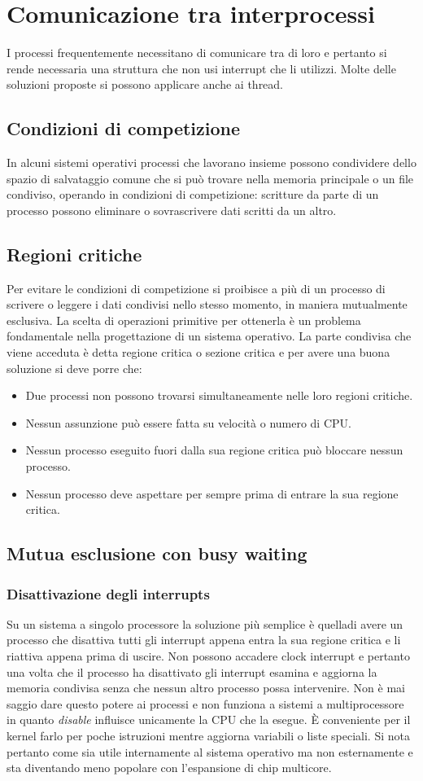 \section{Comunicazione tra interprocessi}
I processi frequentemente necessitano di comunicare tra di loro e pertanto si rende necessaria una struttura che non usi interrupt che li utilizzi. Molte delle soluzioni proposte si 
possono applicare anche ai thread.
\subsection{Condizioni di competizione}
In alcuni sistemi operativi processi che lavorano insieme possono condividere dello spazio di salvataggio comune che si pu\`o trovare nella memoria principale o un file condiviso, 
operando in condizioni di competizione: scritture da parte di un processo possono eliminare o sovrascrivere dati scritti da un altro.
\subsection{Regioni critiche}
Per evitare le condizioni di competizione si proibisce a pi\`u di un processo di scrivere o leggere i dati condivisi nello stesso momento, in maniera mutualmente esclusiva. La scelta di 
operazioni primitive per ottenerla \`e un problema fondamentale nella progettazione di un sistema operativo. La parte condivisa che viene acceduta \`e detta regione critica o sezione
critica e per avere una buona soluzione si deve porre che:
\begin{itemize}
	\item Due processi non possono trovarsi simultaneamente nelle loro regioni critiche.
	\item Nessun assunzione pu\`o essere fatta su velocit\`a o numero di CPU.
	\item Nessun processo eseguito fuori dalla sua regione critica pu\`o bloccare nessun processo.
	\item Nessun processo deve aspettare per sempre prima di entrare la sua regione critica.
\end{itemize}
\subsection{Mutua esclusione con busy waiting}
\subsubsection{Disattivazione degli interrupts}
Su un sistema a singolo processore la soluzione pi\`u semplice \`e quelladi avere un processo che disattiva tutti gli interrupt appena entra la sua regione critica e li riattiva appena
prima di uscire. Non possono accadere clock interrupt e pertanto una volta che il processo ha disattivato gli interrupt esamina e aggiorna la memoria condivisa senza che nessun altro 
processo possa intervenire. Non \`e mai saggio dare questo potere ai processi e non funziona a sistemi a multiprocessore in quanto \emph{disable} influisce unicamente la CPU che la 
esegue. \`E conveniente per il kernel farlo per poche istruzioni mentre aggiorna variabili o liste speciali. Si nota pertanto come sia utile internamente al sistema operativo ma non
esternamente e sta diventando meno popolare con l'espansione di chip multicore. 
